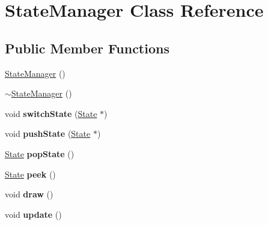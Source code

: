 \hypertarget{class_state_manager}{\section{State\+Manager Class Reference}
\label{class_state_manager}
}
\subsection*{Public Member Functions}
\begin{DoxyCompactItemize}
\item 
\hyperlink{class_state_manager_a3e2be96d935eb56813b096a885d58587}{State\+Manager} ()
\item 
\hyperlink{class_state_manager_a05a43504a033f1befad5c5118249ec6f}{$\sim$\+State\+Manager} ()
\item 
\hypertarget{class_state_manager_af07740b7ca183d1e07cf4a585aa4d3ad}{void {\bfseries switch\+State} (\hyperlink{class_state}{State} $\ast$)}\label{class_state_manager_af07740b7ca183d1e07cf4a585aa4d3ad}

\item 
\hypertarget{class_state_manager_aaec45621ee8f9ad35c5349ad70b64939}{void {\bfseries push\+State} (\hyperlink{class_state}{State} $\ast$)}\label{class_state_manager_aaec45621ee8f9ad35c5349ad70b64939}

\item 
\hypertarget{class_state_manager_a3c27b312aacfb5033d5a343027b506ae}{\hyperlink{class_state}{State} {\bfseries pop\+State} ()}\label{class_state_manager_a3c27b312aacfb5033d5a343027b506ae}

\item 
\hypertarget{class_state_manager_ac2b88c90affda4b64631bca549c89815}{\hyperlink{class_state}{State} {\bfseries peek} ()}\label{class_state_manager_ac2b88c90affda4b64631bca549c89815}

\item 
\hypertarget{class_state_manager_a22666f2f72320ea3be46e9253b7530e2}{void {\bfseries draw} ()}\label{class_state_manager_a22666f2f72320ea3be46e9253b7530e2}

\item 
\hypertarget{class_state_manager_a81d6c48d941963ab5be7a1e642c26d98}{void {\bfseries update} ()}\label{class_state_manager_a81d6c48d941963ab5be7a1e642c26d98}

\end{DoxyCompactItemize}


